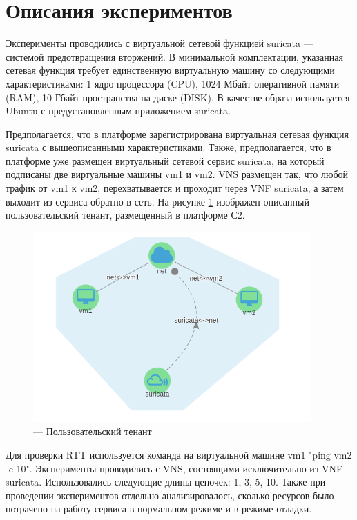 \documentclass[oneside,final,14pt,a4paper]{extreport}
\begin{document}
\section{Описания экспериментов}
Эксперименты проводились с виртуальной сетевой функцией suricata\cite{bib:suricata} --- системой предотвращения вторжений. В минимальной комплектации, указанная сетевая функция требует единственную виртуальную машину со следующими характеристиками: 1 ядро процессора (CPU), 1024 Мбайт оперативной памяти (RAM), 10 Гбайт пространства на диске (DISK). В качестве образа используется Ubuntu с предустановленным приложением suricata.

Предполагается, что в платформе зарегистрирована виртуальная сетевая функция suricata с вышеописанными характеристиками. Также, предполагается, что в платформе уже размещен виртуальный сетевой сервис suricata, на который подписаны две виртуальные машины vm1 и vm2. VNS размещен так, что любой трафик от vm1 к vm2, перехватывается и проходит через VNF suricata, а затем выходит из сервиса обратно в сеть. На рисунке \ref{pic:subscriber_tenant} изображен описанный пользовательский тенант, размещенный в платформе С2. 

\begin{figure}[h]
	\centering
	\includegraphics[width=0.95\textwidth]{subscriber_tenant}
	\caption{--- Пользовательский тенант}
	\label{pic:subscriber_tenant}
\end{figure}

Для проверки RTT используется команда на виртуальной машине vm1 "ping vm2 -c 10". Эксперименты проводились с VNS, состоящими исключительно из VNF suricata. Использовались следующие длины цепочек: 1, 3, 5, 10. Также при проведении экспериментов отдельно анализировалось, сколько ресурсов было потрачено на работу сервиса в нормальном режиме и в режиме отладки.
\end{document}
